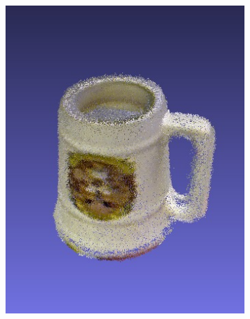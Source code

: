 \documentclass[letterpaper, 10 pt, conference]{ieeeconf}  %
\begin{document}
\begin{figure}[th]
\begin{subfigure}[b]{0.333333\linewidth}
                \includegraphics[width=\linewidth]{../models/big_mug.jpg}
        \end{subfigure}%
        \begin{subfigure}[b]{0.3333\linewidth}
                \centering

\end{subfigure}
\end{figure}
\end{document}
